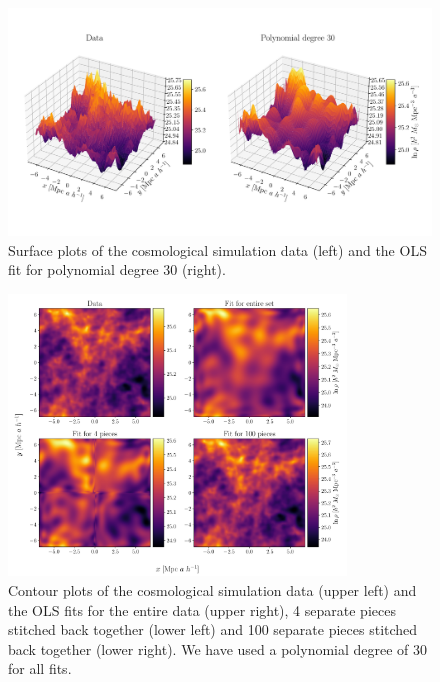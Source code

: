 \documentclass[aps,pra,english,notitlepage,reprint,nofootinbib]{revtex4-1}  %
\begin{document}
\begin{figure}
  \vspace*{-5pt}
  \centering %
  \includegraphics[trim = 0 2cm 0 0,clip,width=\textwidth,keepaspectratio]{../figs/density_surf.pdf}
  \caption{Surface plots of the cosmological simulation data (left) and the OLS fit for polynomial degree 30 (right).}\label{appfig:density surf}
  \vspace*{-5pt}
\end{figure}


\begin{figure}
  \vspace*{-5pt}
  \centering %
  \includegraphics[width=0.8\textwidth]{../figs/density_pieces.pdf}
  \caption{Contour plots of the cosmological simulation data (upper left) and the OLS fits for the entire data (upper right), 4 separate pieces stitched back together (lower left) and 100 separate pieces stitched back together (lower right). We have used a polynomial degree of 30 for all fits.}\label{appfig:density pieces}
  \vspace*{-5pt}
\end{figure}
\end{document}
